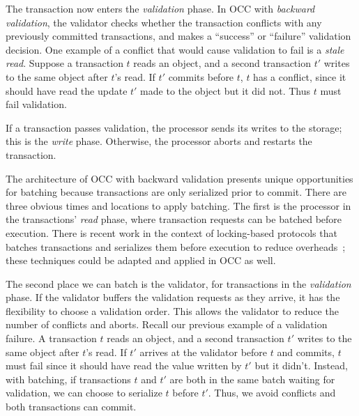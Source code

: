 The transaction now enters the \emph{validation} phase. In OCC with \emph{backward validation}, the validator checks whether the transaction conflicts with any previously committed transactions, and makes a ``success'' or ``failure'' validation decision. One example of a conflict that would cause validation to fail is a \emph{stale read}. Suppose a transaction $t$ reads an object, and a second transaction $t'$ writes to the same object after $t$'s read. If $t'$ commits before $t$, $t$ has a conflict, since it should have read the update $t'$ made to the object but it did not. Thus $t$ must fail validation. 


If a transaction passes validation, the processor sends its writes to the storage; this is the \emph{write} phase. Otherwise, the processor aborts and restarts the transaction.

The architecture of OCC with backward validation presents unique opportunities for batching because transactions are only serialized prior to commit. 
There are three obvious times and locations to apply batching. The first is the processor in the transactions' \emph{read} phase, where transaction requests can be batched before execution. There is recent work in the context of locking-based protocols that  batches transactions and serializes them before execution to reduce overheads~\cite{faleiro2014rethinking,mu2014extracting,thomson2012calvin}; these techniques could be adapted and applied in OCC as well.

The second place we can batch is the validator, for transactions in the \emph{validation} phase. If the validator buffers the validation requests as they arrive, it has the flexibility to choose a validation order. This allows the validator to reduce the number of conflicts and aborts. Recall our previous example of a validation failure. A transaction $t$ reads an object, and a second transaction $t'$ writes to the same object after $t$'s read. If $t'$ arrives at the validator before $t$ and commits, $t$ must fail since it should have read the value written by $t'$ but it didn't. Instead, with batching, if transactions $t$ and $t'$ are both in the same batch waiting for validation, we can choose to serialize $t$ before $t'$. Thus, we avoid conflicts and both transactions can commit.

